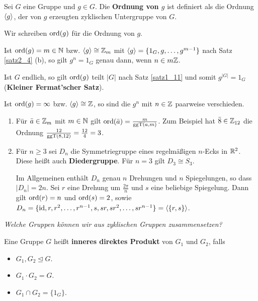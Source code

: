 \begin{definition}
	Sei $G$ eine Gruppe und $g \in G$. Die \textbf{Ordnung von $g$} ist definiert als die Ordnung $\langle g \rangle$, der von $g$ erzeugten zyklischen Untergruppe von $G$.
	
	Wir schreiben $\mathrm{ord}(g)$ für die Ordnung von $g$. 
\end{definition}
\begin{rem}
	Ist $\mathrm{ord}(g) = m \in \mathbb{N}$ bzw. $\langle g \rangle \cong \mathbb{Z}_m$ mit $\langle g \rangle = \{1_G, g, \dots, g^{m-1}\}$ nach Satz \ref{satz2_4} (b), so gilt $g^n = 1_G$ genau dann, wenn $n \in m\mathbb{Z}$. 
	
	Ist $G$ endlich, so gilt $\mathrm{ord}(g)$ teilt $|G|$ nach Satz \ref{satz1_11} und somit $g^{|G|} = 1_G$ (\textbf{Kleiner Fermat'scher Satz}).
	
	Ist $\mathrm{ord}(g) = \infty$ bzw. $\langle g \rangle \cong \mathbb{Z}$, so sind die $g^n$ mit $n \in \mathbb{Z}$ paarweise verschieden.
\end{rem}
\begin{beispiel}
	\begin{enumerate}[label=(\arabic*)]
		\item Für $\bar{a} \in \mathbb{Z}_m$ mit $m \in \mathbb{N}$ gilt $\mathrm{ord}(\bar{a}) = \frac{m}{\mathrm{ggT}(a,m)}$. Zum Beispiel hat $\bar{8} \in \mathbb{Z}_{12}$ die Ordnung $\frac{12}{\mathrm{ggT}(8,12)} = \frac{12}{4} = 3$.
		
		\item Für $n \geq 3$ sei $D_n$ die Symmetriegruppe eines regelmäßigen $n$-Ecks in $\mathbb{R}^2$. Diese heißt auch \textbf{Diedergruppe}. Für $n = 3$ gilt $D_3 \cong S_3$.
		
		Im Allgemeinen enthält $D_n$ genau $n$ Drehungen und $n$ Spiegelungen, so dass $|D_n| = 2n$. Sei $r$ eine Drehung um $\frac{2\pi}{n}$ und $s$ eine beliebige Spiegelung. Dann gilt $\mathrm{ord}(r) = n$ und $\mathrm{ord}(s) = 2$, sowie $D_n = \{\mathrm{id}, r, r^2, \dots, r^{n-1}, s, sr, sr^2, \dots, sr^{n-1}\} = \langle \{r,s\} \rangle$.
	\end{enumerate}
\end{beispiel}

\begin{center}
	\textit{Welche Gruppen können wir aus zyklischen Gruppen zusammensetzen?}
\end{center}

\begin{definition}
	Eine Gruppe $G$ heißt \textbf{inneres direktes Produkt} von $G_1$ und $G_2$, falls
	\begin{itemize}
		\item $G_1, G_2 \unlhd G$.
		\item $G_1 \cdot G_2 = G$.
		\item $G_1 \cap G_2 = \{1_G\}$.
	\end{itemize}
\end{definition}

